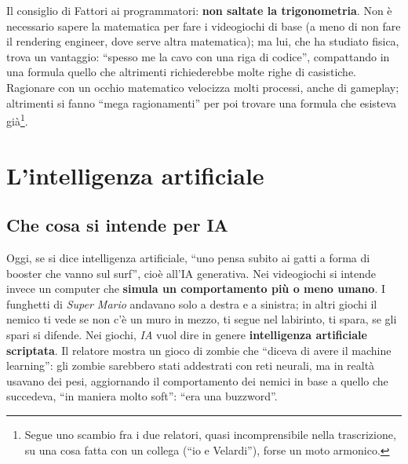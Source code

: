 Il consiglio di Fattori ai programmatori: \textbf{non saltate la
trigonometria}. Non è necessario sapere la matematica per fare i videogiochi di
base (a meno di non fare il rendering engineer, dove serve altra matematica);
ma lui, che ha studiato fisica, trova un vantaggio: ``spesso me la cavo con
una riga di codice'', compattando in una formula quello che altrimenti
richiederebbe molte righe di casistiche. Ragionare con un occhio matematico
velocizza molti processi, anche di gameplay; altrimenti si fanno ``mega
ragionamenti'' per poi trovare una formula che esisteva già\footnote{Segue uno
scambio fra i due relatori, quasi incomprensibile nella trascrizione, su una
cosa fatta con un collega (``io e Velardi''), forse un moto armonico.}.

\section{L'intelligenza artificiale}
\label{p5:sec:ia}

\subsection{Che cosa si intende per IA}

Oggi, se si dice intelligenza artificiale, ``uno pensa subito ai gatti a forma
di booster che vanno sul surf'', cioè all'IA generativa. Nei videogiochi si
intende invece un computer che \textbf{simula un comportamento più o meno
umano}. I funghetti di \emph{Super Mario} andavano solo a destra e a sinistra;
in altri giochi il nemico ti vede se non c'è un muro in mezzo, ti segue nel
labirinto, ti spara, se gli spari si difende. Nei giochi, \emph{IA} vuol dire
in genere \textbf{intelligenza artificiale scriptata}. Il relatore mostra un
gioco di zombie che ``diceva di avere il machine learning'': gli zombie
sarebbero stati addestrati con reti neurali, ma in realtà usavano dei pesi,
aggiornando il comportamento dei nemici in base a quello che succedeva, ``in
maniera molto soft'': ``era una buzzword''.

